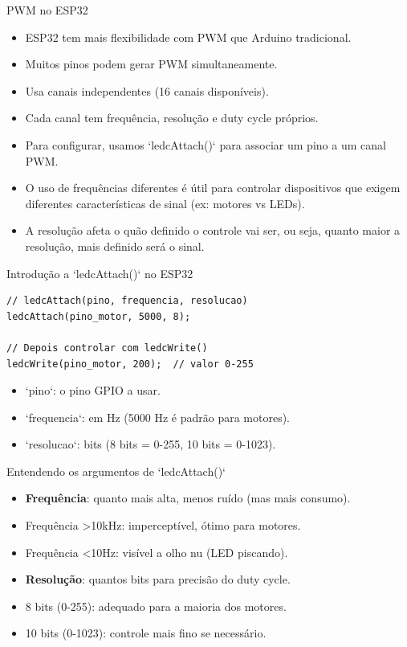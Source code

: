 \documentclass[10pt]{beamer}
\begin{document}
\begin{frame}{PWM no ESP32}
  \begin{itemize}
    \item ESP32 tem mais flexibilidade com PWM que Arduino tradicional.
    \item Muitos pinos podem gerar PWM simultaneamente.
    \item Usa canais independentes (16 canais disponíveis).
    \item Cada canal tem frequência, resolução e duty cycle próprios.
    \item Para configurar, usamos `ledcAttach()` para associar um pino a um canal PWM.
    \item O uso de frequências diferentes é útil para controlar dispositivos que exigem diferentes características de sinal (ex: motores vs LEDs).
    \item A resolução afeta o quão definido o controle vai ser, ou seja, quanto maior a resolução, mais definido será o sinal.
  \end{itemize}
\end{frame}

\begin{frame}[fragile]{Introdução a `ledcAttach()` no ESP32}
\begin{lstlisting}
// ledcAttach(pino, frequencia, resolucao)
ledcAttach(pino_motor, 5000, 8);

// Depois controlar com ledcWrite()
ledcWrite(pino_motor, 200);  // valor 0-255
\end{lstlisting}

  \begin{itemize}
    \item `pino`: o pino GPIO a usar.
    \item `frequencia`: em Hz (5000 Hz é padrão para motores).
    \item `resolucao`: bits (8 bits = 0-255, 10 bits = 0-1023).
  \end{itemize}
\end{frame}

\begin{frame}{Entendendo os argumentos de `ledcAttach()`}
  \begin{itemize}
    \item \textbf{Frequência}: quanto mais alta, menos ruído (mas mais consumo).
    \item Frequência >10kHz: imperceptível, ótimo para motores.
    \item Frequência <10Hz: visível a olho nu (LED piscando).
    \item \textbf{Resolução}: quantos bits para precisão do duty cycle.
    \item 8 bits (0-255): adequado para a maioria dos motores.
    \item 10 bits (0-1023): controle mais fino se necessário.
  \end{itemize}
\end{frame}
\end{document}
